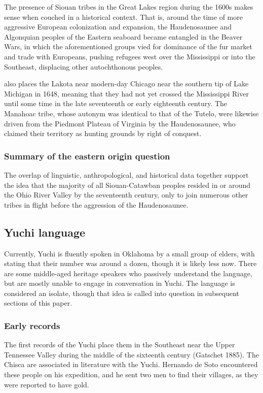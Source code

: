 \documentclass[output=paper]{LSP/langsci}
\begin{document}
The presence of Siouan tribes in the Great Lakes region during the 1600s makes sense when couched in a historical context. That is, around the time of more aggressive European colonization and expansion, the Haudenosaunee and Al\-gon\-qui\-an peoples of the Eastern seaboard became entangled in the Beaver Wars, in which the aforementioned groups vied for dominance of the fur market and trade with Europeans, pushing refugees west over the Mississippi or into the Southeast, displacing other autochthonous peoples. 

\citet{Jennings1990} also places the Lakota near modern-day Chicago near the southern tip of Lake Michigan in 1648, meaning that they had not yet crossed the Mississippi River until some time in the late seventeenth or early eighteenth century. The Manahoac tribe, whose autonym was identical to that of the Tutelo, were likewise driven from the Piedmont Plateau of Virginia by the Haudenosaunee, who claimed their territory as hunting grounds by right of conquest.

\subsubsection{Summary of the eastern origin question} 

The overlap of linguistic, anthropological, and historical data together support the idea that the majority of all Siouan-Catawban peoples resided in or around the Ohio River Valley by the seventeenth century, only to join numerous other tribes in flight before the aggression of the Haudenosaunee.

\subsection{Yuchi language}

Currently, Yuchi is fluently spoken in Oklahoma by a small group of elders, with \citet{Linn2000} stating that their number was around a dozen, though it is likely less now. There are some middle-aged heritage speakers who passively understand the language, but are mostly unable to engage in conversation in Yuchi. The language is considered an isolate, though that idea is called into question in subsequent sections of this paper.

\subsubsection{Early records} 

The first records of the Yuchi place them in the Southeast near the Upper Tennessee Valley during the middle of the sixteenth century (Gatschet 1885). The Chisca are associated in literature with the Yuchi. Hernando de Soto encountered these people on his expedition, and he sent two men to find their villages, as they were reported to have gold. 
\end{document}

